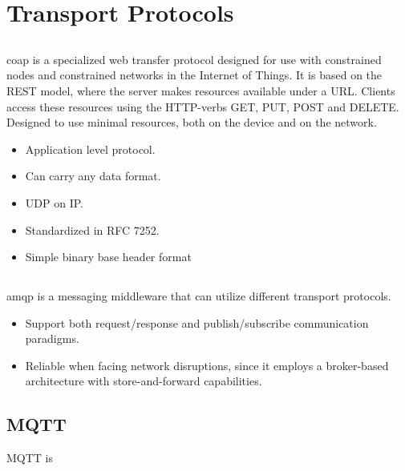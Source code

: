 \documentclass[USenglish]{ifimaster}
\begin{document}
\section{Transport Protocols}

\subsection{}

\gls{coap} is a specialized web transfer protocol designed for use with
constrained nodes and constrained networks in the Internet of Things. It is
based on the REST model, where the server makes resources available  under a
URL. Clients access these resources using the HTTP-verbs GET, PUT, POST and
DELETE. Designed to use minimal resources, both on the device and on the
network.

\begin{itemize}
    \item Application level protocol.
    \item Can carry any data format.
    \item UDP on IP.
    \item Standardized in RFC 7252.
    \item Simple binary base header format
\end{itemize}


\subsection{}

\gls{amqp} is a messaging middleware that can utilize different transport
protocols.

\begin{itemize}
    \item Support both request/response and publish/subscribe communication
    paradigms.
    \item Reliable when facing network disruptions, since it employs a
    broker-based architecture with store-and-forward capabilities.
\end{itemize}

\subsection{MQTT}
MQTT is

\subsection{}
\end{document}
